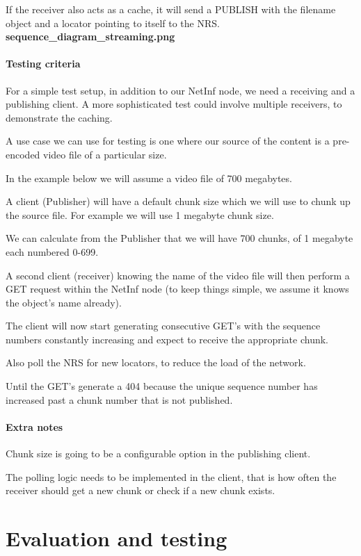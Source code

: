 \documentclass[11pt]{report}
\begin{document}
If the receiver also acts as a cache, it will send a PUBLISH with the filename object and a locator pointing to itself to the NRS.
\\

\textbf{sequence\_diagram\_streaming.png}

\subsubsection{Testing criteria} 

For a simple test setup, in addition to our NetInf node, we need a receiving and a publishing client. A more sophisticated test could involve multiple receivers, to demonstrate the caching.

A use case we can use for testing is one where our source of the content is a pre-encoded video file of a particular size.

In the example below we will assume a video file of 700 megabytes.

A client (Publisher) will have a default chunk size which we will use to chunk up the source file. For example we will use 1 megabyte chunk size.

We can calculate from the Publisher that we will have 700 chunks, of 1 megabyte each numbered 0-699. 

A second client (receiver) knowing the name of the video file will then perform a GET request within the NetInf node (to keep things simple, we assume it knows the object's name already).

The client will now start generating consecutive GET's with the sequence numbers constantly increasing and expect to receive the appropriate chunk.

Also poll the NRS for new locators, to reduce the load of the network.

Until the GET's generate a 404 because the unique sequence number has increased past a chunk number that is not published.

\subsubsection{Extra notes}

Chunk size is going to be a configurable option in the publishing client.

The polling logic needs to be implemented in the client, that is how often the receiver should get a new chunk or check if a new chunk exists.  

\chapter{Evaluation and testing}
\end{document}

